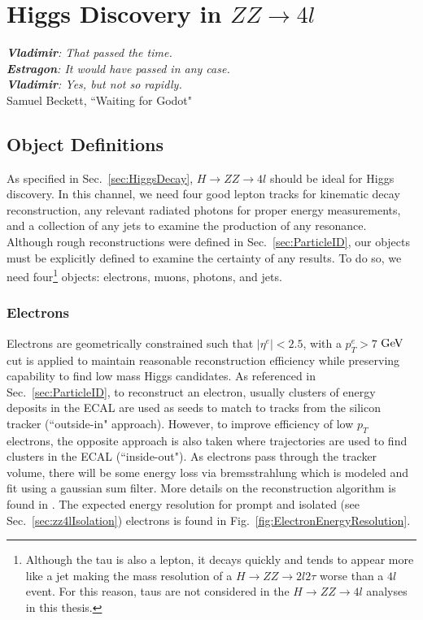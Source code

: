 \chapter{Higgs Discovery in $ZZ\rightarrow4l$}
\label{sec:discovery}

\begin{center}
\begin{footnotesize}
\textit{\textbf{Vladimir}: That passed the time.\\
\textbf{Estragon}: It would have passed in any case.\\
\textbf{Vladimir}: Yes, but not so rapidly.}\\
Samuel Beckett, ``Waiting for Godot"
\end{footnotesize}
\end{center}

\section{Object Definitions}
\label{sec:zz4lObjects}

As specified in Sec.~\ref{sec:HiggsDecay}, $H\rightarrow ZZ \rightarrow 4l$ should be ideal for Higgs discovery. In this channel, we need four good lepton tracks for kinematic decay reconstruction, any relevant radiated photons for proper energy measurements, and a collection of any jets to examine the production of any resonance. Although rough reconstructions were defined in Sec.~\ref{sec:ParticleID}, our objects must be explicitly defined to examine the certainty of any results. To do so, we need four\footnote{Although the tau is also a lepton, it decays quickly and tends to appear more like a jet making the mass resolution of a $H\rightarrow ZZ \rightarrow 2l2\tau$ worse than a $4l$ event. For this reason, taus are not considered in the $H\rightarrow ZZ \rightarrow 4l$ analyses in this thesis.} objects: electrons, muons, photons, and jets.

\subsection{Electrons}
\label{sec:zz4lElectrons}

Electrons are geometrically constrained such that $|\eta^e|<2.5$, with a $p_T^e>7$ $\rm{GeV}$ cut is applied to maintain reasonable reconstruction efficiency while preserving capability to find low mass Higgs candidates. As referenced in Sec.~\ref{sec:ParticleID}, to reconstruct an electron, usually clusters of energy deposits in the ECAL are used as seeds to match to tracks from the silicon tracker (``outside-in" approach). However, to improve efficiency of low $p_T$ electrons, the opposite approach is also taken where trajectories are used to find clusters in the ECAL (``inside-out"). As electrons pass through the tracker volume, there will be some energy loss via bremsstrahlung which is modeled and fit using a gaussian sum filter. More details on the reconstruction algorithm is found in \cite{Baffioni:2006cd,CMS-PAS-EGM-10-004,CMS_DPS_2011-003}. The expected energy resolution for prompt and isolated (see Sec.~\ref{sec:zz4lIsolation}) electrons is found in Fig.~\ref{fig:ElectronEnergyResolution}.

